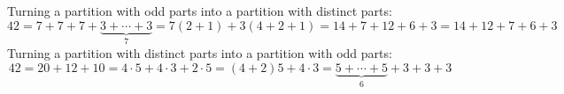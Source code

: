 

\setcounter{section}{3}
\setcounter{subsection}{5}
\setcounter{dfn}{12}

\begin{exl}
Turning a partition with odd parts into a partition with distinct parts:
\[
42 = 7+7+7+\underbrace{3+ \cdots +3}_{7} = 7 (2+1) + 3(4+2+1) = 14 + 7 + 12 + 6 + 3 = 14 + 12 + 7 + 6 + 3
\]
Turning a partition with distinct parts into a partition with odd parts:
\[
42 = 20 + 12 + 10 = 4\cdot 5 + 4 \cdot 3 + 2 \cdot 5 = (4+2)5 + 4\cdot 3 = \underbrace{5+\cdots+5}_{6} + 3 + 3 + 3
\]
\end{exl}

